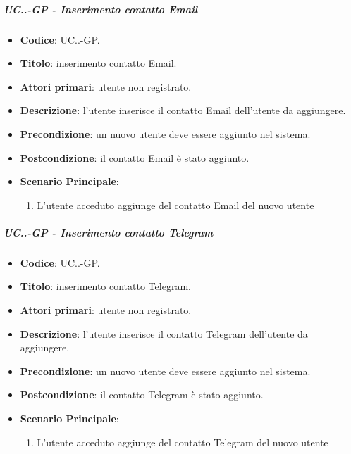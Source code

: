 		\subparagraph{UC\theuccount.\thesubuccount.\thesubsubuccount-GP - Inserimento contatto Email}
			
			\begin{itemize}
				\item \textbf{Codice}: UC\theuccount.\thesubuccount.\thesubsubuccount-GP.
				\item \textbf{Titolo}: inserimento contatto Email.
				\item \textbf{Attori primari}: utente non registrato.
				\item \textbf{Descrizione}: l'utente inserisce il contatto Email dell'utente da aggiungere.
				\item \textbf{Precondizione}: un nuovo utente deve essere aggiunto nel sistema.
				\item \textbf{Postcondizione}: il contatto Email è stato aggiunto.
				\item \textbf{Scenario Principale}:
				\begin{enumerate}
					\item L'utente acceduto aggiunge del contatto Email del nuovo utente
				\end{enumerate}
		\end{itemize}
		
		\subparagraph{UC\theuccount.\thesubuccount.\thesubsubuccount-GP - Inserimento contatto Telegram}
			
			\begin{itemize}
				\item \textbf{Codice}: UC\theuccount.\thesubuccount.\thesubsubuccount-GP.
				\item \textbf{Titolo}: inserimento contatto Telegram.
				\item \textbf{Attori primari}: utente non registrato.
				\item \textbf{Descrizione}: l'utente inserisce il contatto Telegram dell'utente da aggiungere.
				\item \textbf{Precondizione}: un nuovo utente deve essere aggiunto nel sistema.
				\item \textbf{Postcondizione}: il contatto Telegram è stato aggiunto.
				\item \textbf{Scenario Principale}:
				\begin{enumerate}
					\item L'utente acceduto aggiunge del contatto Telegram del nuovo utente
				\end{enumerate}
			\end{itemize}
	
